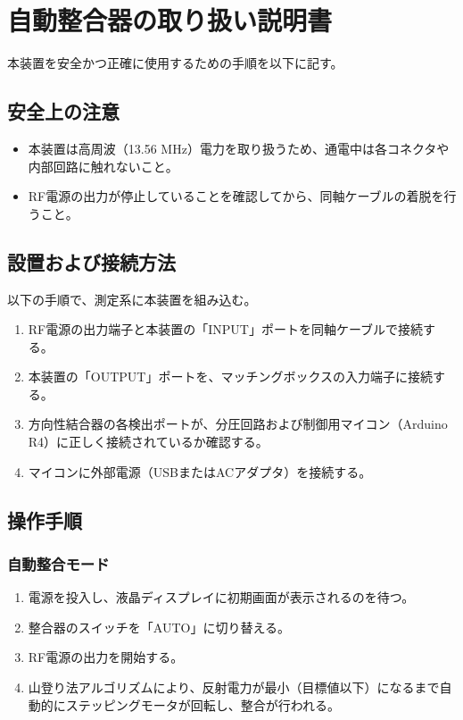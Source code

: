 \documentclass[uplatex, 12pt]{ujbook}
\begin{document}



\appendix
\chapter{自動整合器の取り扱い説明書}
本装置を安全かつ正確に使用するための手順を以下に記す。

\section{安全上の注意}
\begin{itemize}
    \item 本装置は高周波（13.56 MHz）電力を取り扱うため、通電中は各コネクタや内部回路に触れないこと。
    \item RF電源の出力が停止していることを確認してから、同軸ケーブルの着脱を行うこと。
\end{itemize}

\section{設置および接続方法}
以下の手順で、測定系に本装置を組み込む。
\begin{enumerate}
    \item RF電源の出力端子と本装置の「INPUT」ポートを同軸ケーブルで接続する。
    \item 本装置の「OUTPUT」ポートを、マッチングボックスの入力端子に接続する。
    \item 方向性結合器の各検出ポートが、分圧回路および制御用マイコン（Arduino R4）に正しく接続されているか確認する。
    \item マイコンに外部電源（USBまたはACアダプタ）を接続する。
\end{enumerate}

\section{操作手順}
\subsection{自動整合モード}
\begin{enumerate}
    \item 電源を投入し、液晶ディスプレイに初期画面が表示されるのを待つ。
    \item 整合器のスイッチを「AUTO」に切り替える。
    \item RF電源の出力を開始する。
    \item 山登り法アルゴリズムにより、反射電力が最小（目標値以下）になるまで自動的にステッピングモータが回転し、整合が行われる。
\end{enumerate}
\end{document}

